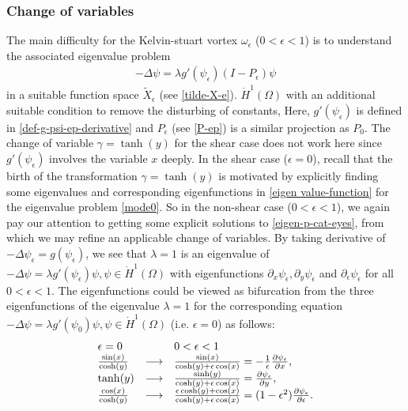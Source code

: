 \documentclass[1 [leqno, 11pt]{amsart}
\numberwithin{equation}{section}
\let\ep=\epsilon
\begin{document}
\begin{CJK*}{GBK}{song}
\subsubsection{Change of variables}\label{change of variables for cat's eyes  flows}
The main difficulty for  the Kelvin-stuart vortex  $\omega_\ep$ ($0 < \ep < 1$)   is to understand
the associated eigenvalue problem
\begin{align}\label{eigen-p-cat-eyes}
-\Delta \psi = \lambda g'(\psi_\epsilon)(I - P_\epsilon)\psi
\end{align}
in a suitable function space $\tilde X_\ep$ (see \eqref{tilde-X-e}).
$\dot{H}^1(\Omega)$ with an additional suitable condition to remove the disturbing of constants,
\fi
Here, $g'(\psi_\epsilon)$ is defined in \eqref{def-g-psi-ep-derivative} and $P_\epsilon$ (see  \eqref{P-ep}) is a similar projection as $P_0$.
The change of variable $\gamma=\tanh(y)$ for the shear case does not work here since  $g'(\psi_\epsilon)$ involves the variable $x$ deeply. In the shear case ($\ep=0$), recall that the birth of the transformation  $\gamma=\tanh(y)$ is motivated by explicitly finding some eigenvalues and corresponding eigenfunctions  in \eqref{eigen value-function} for  the eigenvalue problem \eqref{mode0}. So in the non-shear case ($0<\ep<1$), we again pay our attention to getting some explicit solutions  to \eqref{eigen-p-cat-eyes}, from which we may refine an applicable change of variables.
By taking derivative of  $-\Delta \psi_\epsilon = g(\psi_\epsilon)$, we see that    $\lambda=1$ is an eigenvalue   of $
-\Delta \psi = \lambda g'(\psi_\epsilon)\psi, \psi\in\dot{H}^1(\Omega)
$  with   eigenfunctions  $\partial_x \psi_\ep, \partial_y \psi_\ep$ and $\partial_\epsilon \psi_\ep$  for all $0<\epsilon<1$. The eigenfunctions  could be viewed  as bifurcation from  the three eigenfunctions of the eigenvalue $\lambda=1$ for the corresponding equation
$-\Delta\psi=\lambda g'(\psi_0)\psi, \psi\in\dot{H}^1(\Omega)$  (i.e. $\ep=0$) as follows:
\begin{align} \label{bifurcation1}\begin{array}{llll}
\ep=0&&0<\ep<1\\
{\sin(x)\over \cosh(y)}&\longrightarrow&\frac{\sin(x)}{\cosh(y)+\epsilon \cos(x)}=-{1\over \ep}{\partial \psi_\ep\over\partial x},\\
 \tanh(y)&\longrightarrow& \frac{\sinh(y)}{\cosh(y)+\epsilon \cos(x)}=\frac{ \partial \psi_\ep}{\partial y}, \\
 {\cos(x)\over \cosh(y)}&\longrightarrow&  \frac{\epsilon \cosh(y) + \cos(x)}{\cosh(y)+\epsilon \cos(x)}=(1 - \epsilon^2) \frac{ \partial \psi_\ep}{\partial \ep}.

\end{array}
\end{align}
\end{CJK*}
\end{document}
